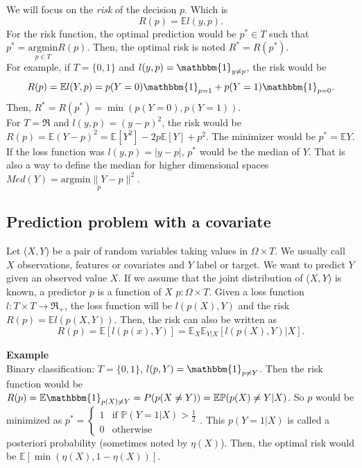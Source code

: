 \documentclass[11pt, english]{article}
\begin{document}
We will focus on the \textit{risk} of the decision $p$. Which is
\begin{equation}
	R(p)=\mathbb{E}l(y,p).
\end{equation}
For the risk function, the optimal prediction would be $p^*\in T$ such that $p^*=\underset{p\in T}{\text{argmin}}R(p)$. Then, the optimal risk is noted $R^*=R(p^*)$.\\

For example, if $ T=\{0,1\}$ and $l(y,p)=\mathbbm{1}_{y\neq p}$, the risk would be 
\begin{equation}
	R(p)=\mathbb{E}l(Y,p)=p(Y=0)\mathbbm{1}_{p=1}+p(Y=1)\mathbbm{1}_{p=0}.
\end{equation}
Then, $R^*=R(p^*)=\min(p(Y=0),p(Y=1))$.\\

For $ T=\Re$ and $l(y,p)=(y-p)^2$, the risk would be $R(p)=\mathbb{E}(Y-p)^2=\mathbb{E}[Y^2]-2p\mathbb{E}[Y]+p^2$. The minimizer would be $p^*=\mathbb{E}Y$. If the loss function was $l(y,p)=|y-p|$, $p^*$ would be the median of $Y$. That is also a way to define the median for higher dimensional spaces $Med(Y)=\underset{p}{\text{argmin}\|Y-p\|^2}$.

\subsection{Prediction problem with a covariate}

Let ($X,Y$) be a pair of random variables taking values in $\Omega\times T$. We usually call $X$ observations, features or covariates and $Y$ label or target. We want to predict $Y$ given an observed value $X$. If we assume that the joint distribution of ($X,Y$) is known, a predictor $p$ is a function of $X$ $p:\Omega\times T$. Given a loss function $l:T\times T\rightarrow \Re_{+}$, the loss function will be $l(p(X),Y)$ and the risk $R(p)=\mathbb{E}l(p(X,Y))$. Then, the risk can also be written as 
\begin{equation}
	R(p)=\mathbb{E}[l(p(x),Y)]=\mathbb{E}_X\mathbb{E}_{Y|X}[l(p(X),Y)|X].
\end{equation}


\textbf{Example\\}
Binary classification: $T=\{0,1\}$, $l(p,Y)=\mathbbm{1}_{p\neq Y}$. Then the risk function would be $R(p)=\mathbb{E}\mathbbm{1}_{p(X)\neq Y}=P(p(X\neq Y))=\mathbb{E}\mathbb{P}(p(X)\neq Y|X)$. So $p$ would be minimized as $p^*=\left\{\begin{array}{ll}
1 & \text{if }\mathbb{P}(Y=1|X)>\frac{1}{2}\\
0 & \text{otherwise}
\end{array}\right.$. This $p(Y=1|X)$ is called a posteriori probability (sometimes noted by $\eta(X)$). Then, the optimal risk would be $\mathbb{E}[\min(\eta(X),1-\eta(X))]$. 
\end{document}
